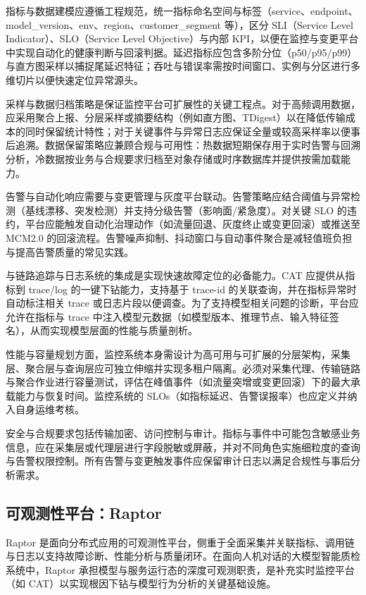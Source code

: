 指标与数据建模应遵循工程规范，统一指标命名空间与标签（service、endpoint、model\_version、env、region、customer\_segment 等），区分 SLI（Service Level Indicator）、SLO（Service Level Objective）与内部 KPI，以便在监控与变更平台中实现自动化的健康判断与回滚判据。延迟指标应包含多阶分位（p50/p95/p99）与直方图采样以捕捉尾延迟特征；吞吐与错误率需按时间窗口、实例与分区进行多维切片以便快速定位异常源头。

采样与数据归档策略是保证监控平台可扩展性的关键工程点。对于高频调用数据，应采用聚合上报、分层采样或摘要结构（例如直方图、TDigest）以在降低传输成本的同时保留统计特性；对于关键事件与异常日志应保证全量或较高采样率以便事后追溯。数据保留策略应兼顾合规与可用性：热数据短期保存用于实时告警与回溯分析，冷数据按业务与合规要求归档至对象存储或时序数据库并提供按需加载能力。

告警与自动化响应需要与变更管理与灰度平台联动。告警策略应结合阈值与异常检测（基线漂移、突发检测）并支持分级告警（影响面/紧急度）。对关键 SLO 的违约，平台应能触发自动化治理动作（如流量回退、灰度终止或变更回滚）或推送至 MCM2.0 的回滚流程。告警噪声抑制、抖动窗口与自动事件聚合是减轻值班负担与提高告警质量的常见实践\cite{HAN2023111735}。

与链路追踪与日志系统的集成是实现快速故障定位的必备能力。CAT 应提供从指标到 trace/log 的一键下钻能力，支持基于 trace-id 的关联查询，并在指标异常时自动标注相关 trace 或日志片段以便调查。为了支持模型相关问题的诊断，平台应允许在指标与 trace 中注入模型元数据（如模型版本、推理节点、输入特征签名），从而实现模型层面的性能与质量剖析。

性能与容量规划方面，监控系统本身需设计为高可用与可扩展的分层架构，采集层、聚合层与查询层应可独立伸缩并实现多租户隔离。必须对采集代理、传输链路与聚合作业进行容量测试，评估在峰值事件（如流量突增或变更回滚）下的最大承载能力与恢复时间。监控系统的 SLOs（如指标延迟、告警误报率）也应定义并纳入自身运维考核。

安全与合规要求包括传输加密、访问控制与审计。指标与事件中可能包含敏感业务信息，应在采集层或代理层进行字段脱敏或屏蔽，并对不同角色实施细粒度的查询与告警权限控制。所有告警与变更触发事件应保留审计日志以满足合规性与事后分析需求。
\subsection{可观测性平台：Raptor}
Raptor 是面向分布式应用的可观测性平台，侧重于全面采集并关联指标、调用链与日志以支持故障诊断、性能分析与质量闭环\cite{10.1145/3501297}。在面向人机对话的大模型智能质检系统中，Raptor 承担模型与服务运行态的深度可观测职责，是补充实时监控平台（如 CAT）以实现根因下钻与模型行为分析的关键基础设施。

